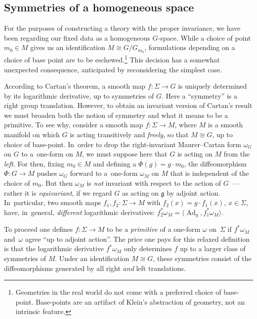 \documentclass[11pt]{article}
\numberwithin{equation}{section}
\numberwithin{equation}{section}
\DeclareMathOperator{\Adjoint}{Ad}
\begin{document}
\subsection*{Symmetries of a homogeneous space}

For the purposes of constructing a theory with the proper invariance,
we have been regarding our fixed data as a homogeneous
$G$-space. While a choice of point $m_0 \in M$ gives us an
identification $M \cong G/G_{m_0}$, formulations depending on a choice
of base point are to be eschewed.\footnote{Geometries in the real
 world do not come with a preferred choice of base-point. Base-points
 are an artifact of Klein's abstraction of geometry, not an intrinsic
 feature.} This decision has a somewhat unexpected consequence,
anticipated by reconsidering the simplest case.

According to Cartan's theorem, a smooth map $f \colon \Sigma
\rightarrow G$ is uniquely determined by its logarithmic derivative,
up to symmetries of $G$. Here a ``symmetry'' is a right group
translation. However, to obtain an invariant version of Cartan's
result we must broaden both the notion of symmetry and what it means
to be a primitive. To see why, consider a smooth map $f \colon \Sigma
\rightarrow M$, where $ M$ is a smooth manifold on which $G$ is acting
transitively and {\em freely}, so that $M \cong G$, up to choice of
base-point. In~order to drop the right-invariant Maurer--Cartan form
$\omega_G$ on $G$ to a~one-form on $ M$, we must suppose here that $G$
is acting on $ M$ from the {\em left}. For then, fixing $ m_0 \in M$
and defining a $\Phi(g) = g \cdot m_0 $, the diffeomorphism $\Phi
\colon G \rightarrow M$ pushes $\omega_G$ forward to a~one-form
$\omega_M $ on $M$ that is independent of the choice of $ m_0$. But
then $\omega_M$ is {\em not} invariant with respect to the action of
$G$~--- rather it is {\em equivariant}, if we regard $G$ as acting on
${\mathfrak g} $ by adjoint action. In~particular, two smooth maps
$f_1, f_2 \colon \Sigma \rightarrow M$ with $f_2(x)=g \cdot f_1(x)$,
$x \in \Sigma $, have, in~general, {\em different} logarithmic
derivatives: $f_2^*\omega_M = \langle\Adjoint_g,f_1^* \omega_M\rangle
$.

To proceed one defines $f \colon \Sigma \rightarrow M$ to be a {\it primitive} of a one-form $\omega $ on~$\Sigma $ if $f^*\omega_M $ and~$\omega $ agree ``up to adjoint action''. The price one pays for this
relaxed definition is that the logarithmic derivative $f^* \omega_M $
only determines $f$ up to a larger class of symmetries of $M$. Under
an identification $M \cong G$, these symmetries consist of the
diffeomorphisms generated by all right {\em and} left translations.
\end{document}
